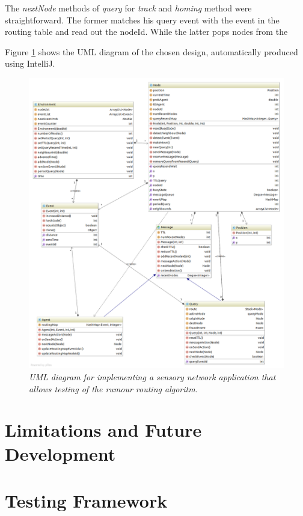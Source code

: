 \documentclass[a4paper,11pt,twoside]{article}
\begin{document}
The \textit{nextNode} methods of \textit{query} for \textit{track} and
\textit{homing} method were straightforward. The former matches his
query event with the event in the routing table and read out the
nodeId. While the latter pops nodes from the 


Figure \ref{fig:uml} shows the UML diagram of the chosen design,
automatically produced using IntelliJ.
\begin{figure}
\centering
\includegraphics[width=\textwidth]{uml.png}
\caption{\textit{UML diagram for implementing a sensory network application
  that allows testing of the rumour routing algoritm.}}
\label{fig:uml}
\end{figure}



\section{Limitations and Future Development}

\section{Testing Framework}
\end{document}
